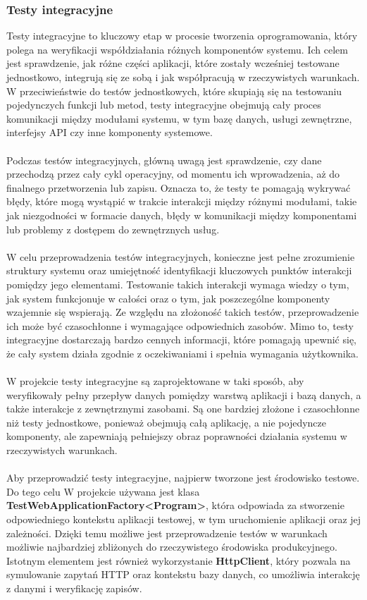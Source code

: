 \documentclass[12pt,a4paper]{article}
\begin{document}
\subsubsection{Testy integracyjne}
Testy integracyjne to kluczowy etap w procesie tworzenia oprogramowania, który polega na weryfikacji współdziałania różnych komponentów systemu. Ich celem jest sprawdzenie, jak różne części aplikacji, które zostały wcześniej testowane jednostkowo, integrują się ze sobą i jak współpracują w rzeczywistych warunkach. W przeciwieństwie do testów jednostkowych, które skupiają się na testowaniu pojedynczych funkcji lub metod, testy integracyjne obejmują cały proces komunikacji między modułami systemu, w tym bazę danych, usługi zewnętrzne, interfejsy API czy inne komponenty systemowe.
\\\\
Podczas testów integracyjnych, główną uwagą jest sprawdzenie, czy dane przechodzą przez cały cykl operacyjny, od momentu ich wprowadzenia, aż do finalnego przetworzenia lub zapisu. Oznacza to, że testy te pomagają wykrywać błędy, które mogą wystąpić w trakcie interakcji między różnymi modułami, takie jak niezgodności w formacie danych, błędy w komunikacji między komponentami lub problemy z dostępem do zewnętrznych usług.
\\\\
W celu przeprowadzenia testów integracyjnych, konieczne jest pełne zrozumienie struktury systemu oraz umiejętność identyfikacji kluczowych punktów interakcji pomiędzy jego elementami. Testowanie takich interakcji wymaga wiedzy o tym, jak system funkcjonuje w całości oraz o tym, jak poszczególne komponenty wzajemnie się wspierają. Ze względu na złożoność takich testów, przeprowadzenie ich może być czasochłonne i wymagające odpowiednich zasobów. Mimo to, testy integracyjne dostarczają bardzo cennych informacji, które pomagają upewnić się, że cały system działa zgodnie z oczekiwaniami i spełnia wymagania użytkownika.
\\\\
W projekcie testy integracyjne są zaprojektowane w taki sposób, aby weryfikowały pełny przepływ danych pomiędzy warstwą aplikacji i bazą danych, a także interakcje z zewnętrznymi zasobami. Są one bardziej złożone i czasochłonne niż testy jednostkowe, ponieważ obejmują całą aplikację, a nie pojedyncze komponenty, ale zapewniają pełniejszy obraz poprawności działania systemu w rzeczywistych warunkach.
\\\\
Aby przeprowadzić testy integracyjne, najpierw tworzone jest środowisko testowe. Do tego celu W projekcie używana jest klasa \textbf{TestWebApplicationFactory<Program>}, która odpowiada za stworzenie odpowiedniego kontekstu aplikacji testowej, w tym uruchomienie aplikacji oraz jej zależności. Dzięki temu możliwe jest przeprowadzenie testów w warunkach możliwie najbardziej zbliżonych do rzeczywistego środowiska produkcyjnego. Istotnym elementem jest również wykorzystanie \textbf{HttpClient}, który pozwala na symulowanie zapytań HTTP oraz kontekstu bazy danych, co umożliwia interakcję z danymi i weryfikację zapisów.
\end{document}
